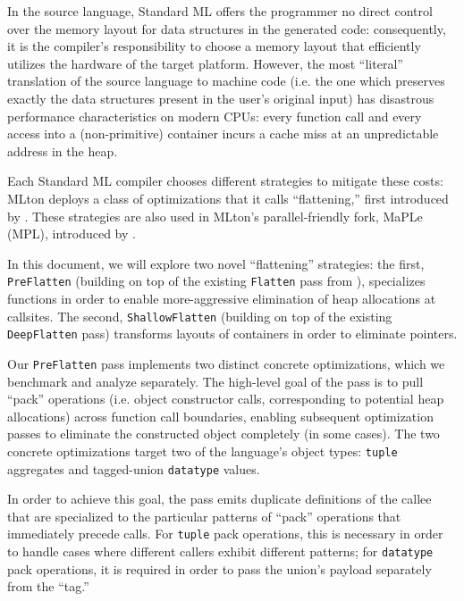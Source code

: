 In the source language, Standard ML offers the programmer no direct control over
the memory layout for data structures in the generated code: consequently, it is
the compiler's responsibility to choose a memory layout that efficiently
utilizes the hardware of the target platform. However, the most ``literal''
translation of the source language to machine code (i.e. the one which preserves
exactly the data structures present in the user's original input) has
disastrous performance characteristics on modern CPUs: every function call and
every access into a (non-primitive) container incurs a cache miss at an
unpredictable address in the heap.


Each Standard ML compiler chooses different strategies to mitigate these costs:
MLton \citep{mlton-website} deploys a class of optimizations that it calls
``flattening,'' first introduced by \citet{flat-paper}. These strategies are
also used in MLton's parallel-friendly fork, MaPLe (MPL), introduced
by \citet{mpl-orig}.

In this document, we will explore two novel ``flattening'' strategies: the
first, \texttt{PreFlatten} (building on top of the existing \texttt{Flatten}
pass from \citet{flat-paper}), specializes functions in order to enable
more-aggressive elimination of heap allocations at callsites. The second,
\texttt{ShallowFlatten} (building on top of the existing \texttt{DeepFlatten}
pass) transforms layouts of containers in order to eliminate pointers.

Our \texttt{PreFlatten} pass implements two distinct concrete optimizations,
which we benchmark and analyze separately. The high-level goal of the pass is to
pull ``pack'' operations (i.e. object constructor calls, corresponding to
potential heap allocations) across function call boundaries, enabling subsequent
optimization passes to eliminate the constructed object completely (in some
cases). The two concrete optimizations target two of the language's object
types: \texttt{tuple} aggregates and tagged-union \texttt{datatype} values.

In order to achieve this goal, the pass emits duplicate definitions of the
callee that are specialized to the particular patterns of ``pack'' operations
that immediately precede calls. For \texttt{tuple} pack operations, this is
necessary in order to handle cases where different callers exhibit different
patterns; for \texttt{datatype} pack operations, it is required in order to pass
the union's payload separately from the ``tag.''


